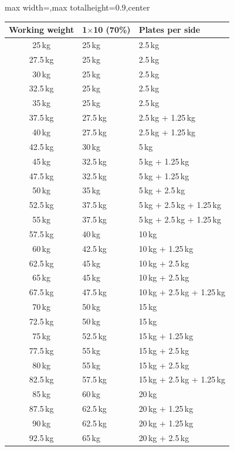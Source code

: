 \documentclass[11pt,a4paper]{article}
\newcommand{\tablearraystretch}{1.15}
\begin{document}
\begin{center}
\renewcommand{\arraystretch}{\tablearraystretch}
\begin{adjustbox}{max width=\linewidth,max totalheight=0.9\textheight,center}
\begin{tabular}{cll}
\toprule
Working weight & 1$\times$10 (70\%) & Plates per side \\
\midrule
25\,kg   & 25\,kg   & 2.5\,kg \\
27.5\,kg & 25\,kg   & 2.5\,kg \\
30\,kg   & 25\,kg   & 2.5\,kg \\
32.5\,kg & 25\,kg   & 2.5\,kg \\
35\,kg   & 25\,kg   & 2.5\,kg \\
37.5\,kg & 27.5\,kg & 2.5\,kg + 1.25\,kg \\
40\,kg   & 27.5\,kg & 2.5\,kg + 1.25\,kg \\
42.5\,kg & 30\,kg   & 5\,kg \\
45\,kg   & 32.5\,kg & 5\,kg + 1.25\,kg \\
47.5\,kg & 32.5\,kg & 5\,kg + 1.25\,kg \\
50\,kg   & 35\,kg   & 5\,kg + 2.5\,kg \\
52.5\,kg & 37.5\,kg & 5\,kg + 2.5\,kg + 1.25\,kg \\
55\,kg   & 37.5\,kg & 5\,kg + 2.5\,kg + 1.25\,kg \\
57.5\,kg & 40\,kg   & 10\,kg \\
60\,kg   & 42.5\,kg & 10\,kg + 1.25\,kg \\
62.5\,kg & 45\,kg   & 10\,kg + 2.5\,kg \\
65\,kg   & 45\,kg   & 10\,kg + 2.5\,kg \\
67.5\,kg & 47.5\,kg & 10\,kg + 2.5\,kg + 1.25\,kg \\
70\,kg   & 50\,kg   & 15\,kg \\
72.5\,kg & 50\,kg   & 15\,kg \\
75\,kg   & 52.5\,kg & 15\,kg + 1.25\,kg \\
77.5\,kg & 55\,kg   & 15\,kg + 2.5\,kg \\
80\,kg   & 55\,kg   & 15\,kg + 2.5\,kg \\
82.5\,kg & 57.5\,kg & 15\,kg + 2.5\,kg + 1.25\,kg \\
85\,kg   & 60\,kg   & 20\,kg \\
87.5\,kg & 62.5\,kg & 20\,kg + 1.25\,kg \\
90\,kg   & 62.5\,kg & 20\,kg + 1.25\,kg \\
92.5\,kg & 65\,kg   & 20\,kg + 2.5\,kg \\

\end{tabular}
\end{adjustbox}
\end{center}
\end{document}
